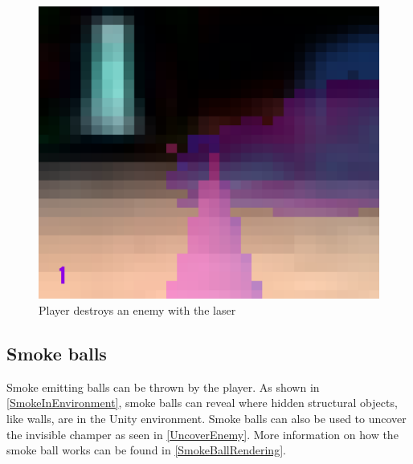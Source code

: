 \begin{figure}[p]
  \includegraphics[height=0.29\textheight]{images/game_systems/Shoot3.png}
  \caption{Player destroys an enemy with the laser}
  \label{DestroyEnemy}
\end{figure}


\subsection{Smoke balls}
Smoke emitting  balls can be thrown by the player. As shown in \cref{SmokeInEnvironment}, smoke balls can reveal where hidden structural objects, like walls, are in the Unity environment. Smoke balls can also be used to uncover the invisible champer as seen in \cref{UncoverEnemy}. More information on how the smoke ball works can be found in \cref{SmokeBallRendering}.

